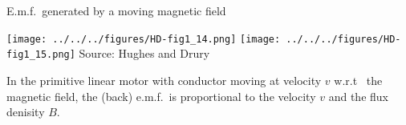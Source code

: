 \documentclass[dvisvgm,hypertex,aspectratio=169]{beamer}
\begin{document}
\begin{frame}{E.m.f.~generated by a moving magnetic field}
\begin{center}
\texttt{[image: ../../../figures/HD-fig1\_14.png]}
\texttt{[image: ../../../figures/HD-fig1\_15.png]}
{\footnotesize Source: Hughes and Drury}
\end{center}

In the primitive linear motor with conductor moving at velocity $v$ w.r.t~ the magnetic field, the (back) e.m.f.~is proportional to the velocity $v$ and the flux denisity $B$.

\end{frame}


%
\end{document}

